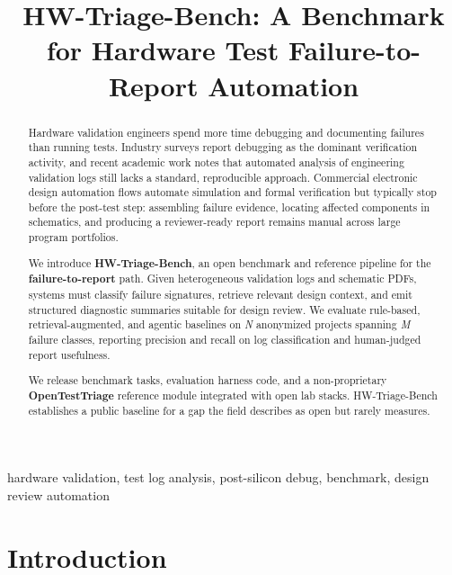 \documentclass[conference]{IEEEtran}
\begin{document}
\title{HW-Triage-Bench: A Benchmark for Hardware Test Failure-to-Report Automation}

\author{
}

\maketitle

\begin{abstract}
Hardware validation engineers spend more time debugging and documenting failures than running tests.
Industry surveys report debugging as the dominant verification activity, and recent academic work notes
that automated analysis of engineering validation logs still lacks a standard, reproducible approach.
Commercial electronic design automation flows automate simulation and formal verification but typically
stop before the post-test step: assembling failure evidence, locating affected components in schematics,
and producing a reviewer-ready report remains manual across large program portfolios.

We introduce \textbf{HW-Triage-Bench}, an open benchmark and reference pipeline for the
\textbf{failure-to-report} path. Given heterogeneous validation logs and schematic PDFs, systems must
classify failure signatures, retrieve relevant design context, and emit structured diagnostic summaries
suitable for design review. We evaluate rule-based, retrieval-augmented, and agentic baselines on
\textit{N} anonymized projects spanning \textit{M} failure classes, reporting precision and recall on log
classification and human-judged report usefulness.

We release benchmark tasks, evaluation harness code, and a non-proprietary \textbf{OpenTestTriage}
reference module integrated with open lab stacks. HW-Triage-Bench establishes a public baseline for a
gap the field describes as open but rarely measures.
\end{abstract}

\begin{IEEEkeywords}
hardware validation, test log analysis, post-silicon debug, benchmark, design review automation
\end{IEEEkeywords}

\section{Introduction}
\label{sec:intro}
\end{document}
